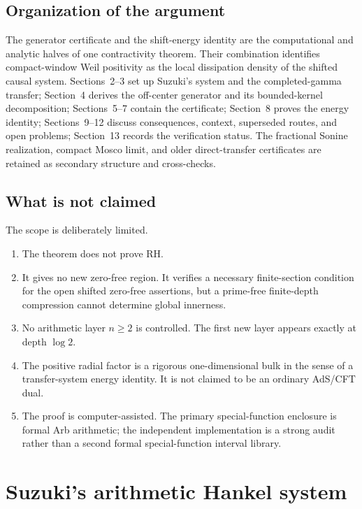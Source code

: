 \documentclass[11pt,a4paper]{article}
\theoremstyle{plain}
\theoremstyle{definition}
\numberwithin{equation}{section}
\begin{document}
\subsection{Organization of the argument}

The generator certificate and the shift-energy identity are the computational
and analytic halves of one contractivity theorem. Their combination identifies
compact-window Weil positivity as the local dissipation density of the shifted
causal system. Sections~2--3 set up Suzuki's system and the completed-gamma
transfer; Section~4 derives the off-center generator and its bounded-kernel
decomposition; Sections~5--7 contain the certificate; Section~8 proves the
energy identity; Sections~9--12 discuss consequences, context, superseded
routes, and open problems; Section~13 records the verification status. The
fractional Sonine realization, compact Mosco limit, and older direct-transfer
certificates are retained as secondary structure and cross-checks.

\subsection{What is not claimed}

The scope is deliberately limited.
\begin{enumerate}[nosep]
\item The theorem does not prove RH.
\item It gives no new zero-free region. It verifies a necessary finite-section
  condition for the open shifted zero-free assertions, but a prime-free
  finite-depth compression cannot determine global innerness.
\item No arithmetic layer $n\ge2$ is controlled. The first new layer appears
  exactly at depth $\log2$.
\item The positive radial factor is a rigorous one-dimensional bulk in the
  sense of a transfer-system energy identity. It is not claimed to be an
  ordinary AdS/CFT dual.
\item The proof is computer-assisted. The primary special-function enclosure
  is formal Arb arithmetic; the independent implementation is a strong audit
  rather than a second formal special-function interval library.
\end{enumerate}

\section{Suzuki's arithmetic Hankel system}
\end{document}
